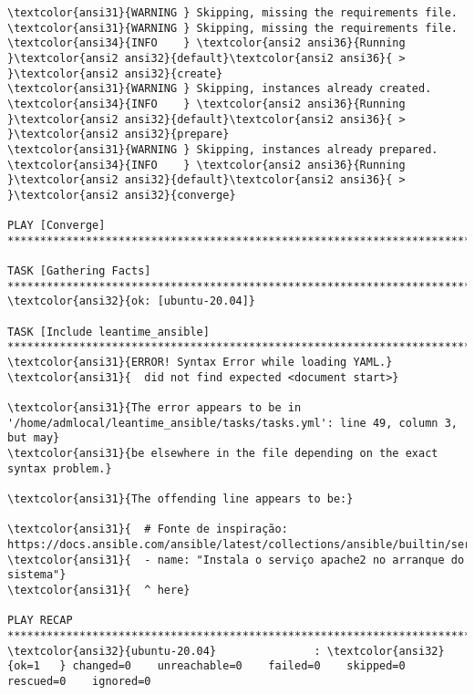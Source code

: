 \documentclass{scrartcl}
\begin{document}
\begin{Verbatim}
\textcolor{ansi31}{WARNING } Skipping, missing the requirements file.
\textcolor{ansi31}{WARNING } Skipping, missing the requirements file.
\textcolor{ansi34}{INFO    } \textcolor{ansi2 ansi36}{Running }\textcolor{ansi2 ansi32}{default}\textcolor{ansi2 ansi36}{ > }\textcolor{ansi2 ansi32}{create}
\textcolor{ansi31}{WARNING } Skipping, instances already created.
\textcolor{ansi34}{INFO    } \textcolor{ansi2 ansi36}{Running }\textcolor{ansi2 ansi32}{default}\textcolor{ansi2 ansi36}{ > }\textcolor{ansi2 ansi32}{prepare}
\textcolor{ansi31}{WARNING } Skipping, instances already prepared.
\textcolor{ansi34}{INFO    } \textcolor{ansi2 ansi36}{Running }\textcolor{ansi2 ansi32}{default}\textcolor{ansi2 ansi36}{ > }\textcolor{ansi2 ansi32}{converge}

PLAY [Converge] *****************************************************************************************************************************************************************************

TASK [Gathering Facts] **********************************************************************************************************************************************************************
\textcolor{ansi32}{ok: [ubuntu-20.04]}

TASK [Include leantime_ansible] *************************************************************************************************************************************************************
\textcolor{ansi31}{ERROR! Syntax Error while loading YAML.}
\textcolor{ansi31}{  did not find expected <document start>}

\textcolor{ansi31}{The error appears to be in '/home/admlocal/leantime_ansible/tasks/tasks.yml': line 49, column 3, but may}
\textcolor{ansi31}{be elsewhere in the file depending on the exact syntax problem.}

\textcolor{ansi31}{The offending line appears to be:}

\textcolor{ansi31}{  # Fonte de inspiração: https://docs.ansible.com/ansible/latest/collections/ansible/builtin/service_module.html}
\textcolor{ansi31}{  - name: "Instala o serviço apache2 no arranque do sistema"}
\textcolor{ansi31}{  ^ here}

PLAY RECAP **********************************************************************************************************************************************************************************
\textcolor{ansi32}{ubuntu-20.04}               : \textcolor{ansi32}{ok=1   } changed=0    unreachable=0    failed=0    skipped=0    rescued=0    ignored=0



\end{Verbatim}
\end{document}

